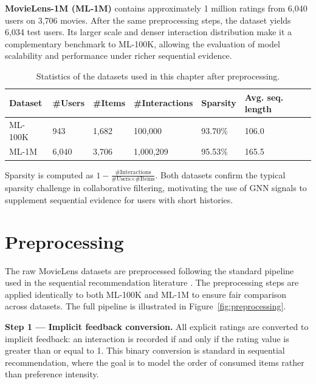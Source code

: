 \documentclass[12pt,a4paper]{report}
\begin{document}
\textbf{MovieLens-1M (ML-1M)} contains approximately 1 million ratings from
6,040 users on 3,706 movies. After the same preprocessing steps, the dataset
yields 6,034 test users. Its larger scale and denser interaction distribution
make it a complementary benchmark to ML-100K, allowing the evaluation of
model scalability and performance under richer sequential evidence.

\begin{table}[h]
\centering
\caption{Statistics of the datasets used in this chapter after preprocessing.}
\label{tab:datasets}
\begin{tabular}{p{2.8cm} p{1.8cm} p{1.8cm} p{2.5cm} p{2.2cm} p{2.2cm}}
\toprule
\textbf{Dataset} & \textbf{\#Users} & \textbf{\#Items} &
\textbf{\#Interactions} & \textbf{Sparsity} & \textbf{Avg. seq. length} \\
\midrule
ML-100K & 943  & 1,682 & 100,000   & 93.70\% & 106.0 \\
ML-1M   & 6,040 & 3,706 & 1,000,209 & 95.53\% & 165.5 \\
\bottomrule
\end{tabular}
\end{table}

\noindent Sparsity is computed as
\(1 - \frac{\text{\#Interactions}}{\text{\#Users} \times \text{\#Items}}\).
Both datasets confirm the typical sparsity challenge in collaborative filtering,
motivating the use of GNN signals to supplement sequential evidence for users
with short histories.

\section{Preprocessing}
\label{sec:preprocessing}

The raw MovieLens datasets are preprocessed following the standard pipeline
used in the sequential recommendation literature
\citep{kang2018sasrec, sun2019bert4rec, pan2024survey}. The preprocessing
steps are applied identically to both ML-100K and ML-1M to ensure fair
comparison across datasets. The full pipeline is illustrated in
Figure~\ref{fig:preprocessing}.

\textbf{Step 1 --- Implicit feedback conversion.}
All explicit ratings are converted to implicit feedback: an interaction is
recorded if and only if the rating value is greater than or equal to 1. This
binary conversion is standard in sequential recommendation, where the goal is
to model the order of consumed items rather than preference intensity.
\end{document}

